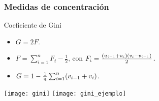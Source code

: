 \documentclass[table]{beamer}
\begin{document}
\begin{frame}
    \frametitle{Medidas de concentración}
    \begin{block}{Coeficiente de Gini}
        \begin{itemize}
            \item $G = 2 F$.
            \item $F = \sum_{i = 1}^{n} F_{i} - \frac{1}{2}$, con $F_{i} = \frac{\parens{u_{i - 1} + u_{i}} \parens{v_{i} - v_{i - 1}}}{2}$.
            \item $G = 1 - \frac{1}{n} \sum_{i = 1}^{n} \parens{v_{i - 1} + v_{i}}$.
        \end{itemize}
    \end{block}
    \begin{center}
        \texttt{[image: gini]}
        \texttt{[image: gini\_ejemplo]}
    \end{center}
\end{frame}

\iffalse
\begin{frame}[allowframebreaks, noframenumbering]
\frametitle<presentation>{References}
\printbibliography
%
\end{frame}
\fi
\end{document}

